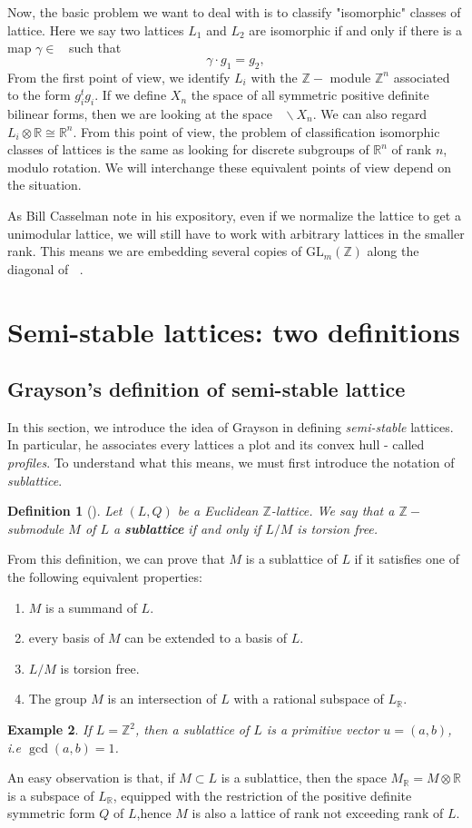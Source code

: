 \documentclass[12pt]{article} %
\newtheorem{definition}{Definition}[section]
\newtheorem{example}[definition]{Example}
\DeclareMathOperator{\slnz}{SL_n(\mathbb{Z})}
\DeclareMathOperator{\glnz}{GL_n(\mathbb{Z})}
\begin{document}
Now, the basic problem we want to deal with is to classify "isomorphic" classes of lattice. Here
we say two lattices $L_1$ and $L_2$ are isomorphic if and only if there is a map $\gamma \in \glnz$ such that
\[\gamma \cdot g_1 = g_2,\]
From the first point of view, we identify $L_i$ with the $\mathbb{Z}-$ module
$\mathbb{Z}^n$ associated to the form $g_i^tg_i$. If we define $X_n$ the space of all
symmetric positive definite bilinear forms, then we are looking at the space $\glnz \backslash X_n$. We can also
regard $L_i \otimes \mathbb{R} \cong \mathbb{R}^n$. From this point of view,
the problem of classification isomorphic classes of lattices is the same as looking for discrete
subgroups of $\mathbb{R}^n$ of rank $n$, modulo rotation. We will interchange these equivalent points of view
depend on the situation.

As Bill Casselman note in his expository, even if we normalize the lattice to get a unimodular
lattice, we will still have to work with arbitrary lattices in the smaller rank. This means we are embedding
several copies of $\text{GL}_m(\mathbb{Z})$ along the diagonal of $\slnz$.
\section{Semi-stable lattices: two definitions}
\subsection{Grayson's definition of semi-stable lattice}
In this section, we introduce the idea of Grayson in defining \textit{semi-stable} lattices.
In particular, he associates every lattices a plot and its convex hull - called \textit{ profiles}. To understand
what this means, we must first introduce the notation of \textit{sublattice}.
\begin{definition}[\label=sublattice]
    Let $(L,Q)$ be a Euclidean $\mathbb{Z}$-lattice. We say that a $\mathbb{Z}-$submodule $M$ of
    $L$ a \textbf{sublattice} if and only if $L/M$ is torsion free.
\end{definition}
From this definition, we can prove that $M$ is a sublattice of $L$ if it satisfies one of the
following equivalent properties:
\begin{enumerate}
    \item $M$ is a summand of $L$.
    \item every basis of $M$ can be extended to a basis of $L$.
    \item $L/M$ is torsion free.
    \item The group $M$ is an intersection of $L$ with a rational subspace of $L_\mathbb{R}$.
\end{enumerate}
\begin{example}
    If $L = \mathbb{Z}^2$, then a sublattice of $L$ is a primitive vector $u = (a,b)$, i.e
    $\gcd(a,b)=1$.
\end{example} 
An easy observation is that, if $M \subset L$ is a sublattice, then the space $M_\mathbb{R} = M \otimes \mathbb{R}$
is a subspace of $L_\mathbb{R}$, equipped with the restriction of the positive definite symmetric form $Q$ of $L$,hence $M$
is also a lattice of rank not exceeding rank of $L$.
\end{document}
